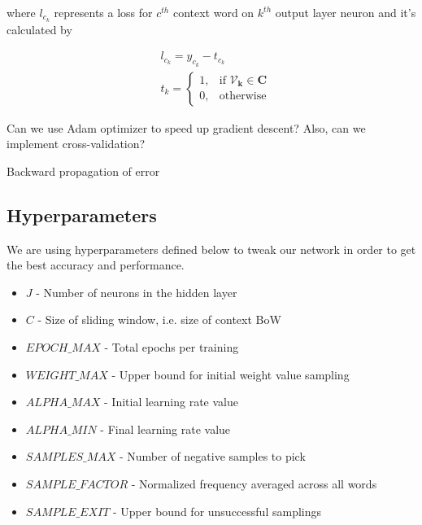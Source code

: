 \documentclass{article}
\newcommand{\SetAlgoStyle}{
	\SetAlgoNoLine
	\SetAlgoNoEnd
	\DontPrintSemicolon
}
\begin{document}
where $l_{c_k}$ represents a loss for $c^{th}$ context word on $k^{th}$ output layer
neuron and it's calculated by

\begin{align}
	&l_{c_k} = y_{c_k} - t_{c_k} \\
	&t_k =
	\begin{cases}
		1, &\text{if } \boldsymbol{\mathcal{V}_k} \in \boldsymbol{C} \\
		0, &\text{otherwise}
	\end{cases}
\end{align}

Can we use Adam optimizer to speed up gradient descent?
Also, can we implement cross-validation?

\begin{algorithm}[H]
	\caption{Backward propagation of error}
	\SetAlgoStyle
\end{algorithm}

\subsection{Hyperparameters}

We are using hyperparameters defined below to tweak our network in order to get the best accuracy and performance.

\begin{itemize}
	\item $J$ - Number of neurons in the hidden layer
	\item $C$ - Size of sliding window, i.e. size of context BoW
	\item $EPOCH\_MAX$ - Total epochs per training
	\item $WEIGHT\_MAX$ - Upper bound for initial weight value sampling
	\item $ALPHA\_MAX$ - Initial learning rate value
	\item $ALPHA\_MIN$ - Final learning rate value
	\item $SAMPLES\_MAX$ - Number of negative samples to pick
	\item $SAMPLE\_FACTOR$ - Normalized frequency averaged across all words
	\item $SAMPLE\_EXIT$ - Upper bound for unsuccessful samplings
\end{itemize}
\end{document}
